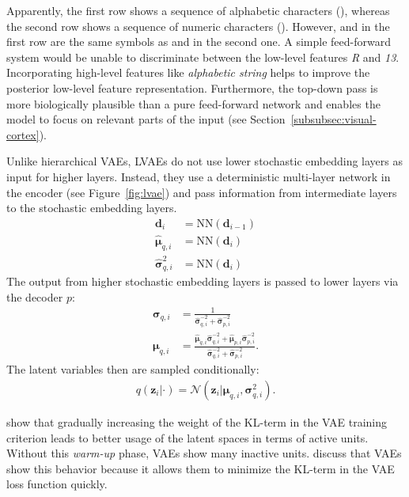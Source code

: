 Apparently, the first row shows a sequence of alphabetic characters (), whereas the second row shows a sequence of numeric characters ().
However,  and  in the first row are the same symbols as  and  in the second one.
A simple feed-forward system would be unable to discriminate between the low-level features \textit{R} and \textit{13}.
Incorporating high-level features like \textit{alphabetic string} helps to improve the posterior low-level feature representation.
Furthermore, the top-down pass is more biologically plausible than a pure feed-forward network and enables the model to focus on relevant parts of the input (see Section~\ref{subsubsec:visual-cortex}).


Unlike hierarchical \acp{VAE}, \acp{LVAE} do not use lower stochastic embedding layers as input for higher layers.
Instead, they use a deterministic multi-layer network in the encoder (see Figure~\ref{fig:lvae}) and pass information from intermediate layers to the stochastic embedding layers.
\begin{align}
    \bm{d}_i &= \text{NN}(\bm{d}_{i-1})\\
    \hat{\bm{\mu}}_{q,i}&=\text{NN}(\bm{d}_i)\\
    \hat{\bm{\sigma}}^2_{q,i}&=\text{NN}(\bm{d}_i)
\end{align}
The output from higher stochastic embedding layers is passed to lower layers via the decoder $p$:
\begin{align}
    \bm{\sigma}_{q,i}&=\frac{1}{\hat{\bm{\sigma}}^{-2}_{q,i}+\hat{\bm{\sigma}}^{-2}_{p,i}}\\
    \bm{\mu}_{q,i}&=\frac{\hat{\bm{\mu}}_{q,i}\hat{\bm{\sigma}}^{-2}_{q,i}+\hat{\bm{\mu}}_{p,i}\hat{\bm{\sigma}}^{-2}_{p,i}}{\hat{\bm{\sigma}}^{-2}_{q,i}+\hat{\bm{\sigma}}^{-2}_{p,i}}.
\end{align}
The latent variables then are sampled conditionally:
\begin{align}
    q(\bm{z}_i|\cdot)=\mathcal{N}(\bm{z}_i|\bm{\mu}_{q,i},\bm{\sigma}^2_{q,i}).
\end{align}

\citet{sonderby2016ladder} show that gradually increasing the weight of the KL-term in the \ac{VAE} training criterion leads to better usage of the latent spaces in terms of active units.
Without this \textit{warm-up} phase, \acp{VAE} show many inactive units.
\citet{sonderby2016ladder} discuss that \acp{VAE} show this behavior because it allows them to minimize the KL-term in the \ac{VAE} loss function quickly.

